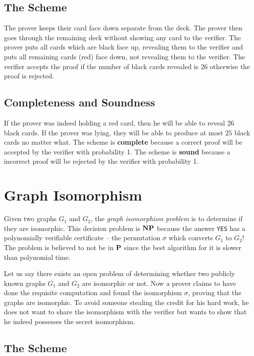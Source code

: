 \subsection{The Scheme}
The prover keeps their card face down separate from the deck. The prover then goes through the remaining deck 
without showing any card to the verifier. The prover puts all cards which are black face up, revealing 
them to the verifier and puts all remaining cards (red) face down, not revealing them to the verifier.
The verifier accepts the proof if the number of black cards revealed is $26$ otherwise the proof is rejected.
\subsection{Completeness and Soundness}
If the prover was indeed holding a red card, then he will be able to reveal $26$ black cards. If the prover 
was lying, they will be able to produce at most $25$ black cards no matter what. The scheme is 
\textbf{complete} because a correct proof will be accepted by the verifier with probability 1. 
The scheme is \textbf{sound} because a incorrect proof will be rejected by the verifier with probability 1.

\section{Graph Isomorphism}
Given two graphs \(G_1\) and \(G_2\), the \emph{graph isomorphism problem} is to determine 
if they are isomorphic. This decision problem is $\mathbf{NP}$ because the answer \texttt{YES} has a polynomially 
verifiable certificate -- the permutation $\sigma$ which converts $G_1$ to $G_2$! The problem is believed 
to not be in $\mathbf{P}$ since the best algorithm for it is slower than polynomial time.

Let us say there exists an open problem of determining whether two publicly known graphs $G_1$ and $G_2$ 
are isomorphic or not. Now a prover claims to have done the requisite computation 
and found the isomorphism $\sigma$, proving that the graphs are isomorphic. 
To avoid someone stealing the credit for his hard work, he does not want to share the isomorphism 
with the verifier but wants to show that he indeed possesses the secret isomorphism. 

\subsection{The Scheme}

